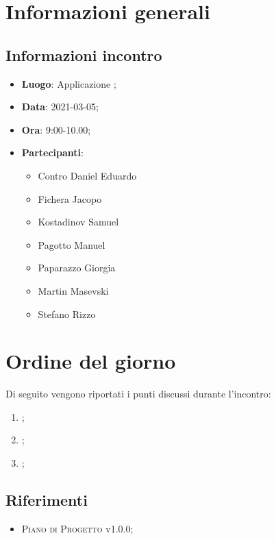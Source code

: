 \documentclass{article}
\begin{document}


\section{Informazioni generali}
\label{sec:info_generali}

\subsection{Informazioni incontro}
\label{sub:info_incontro}

\begin{itemize}
	\item \textbf{Luogo}: Applicazione ;
	\item \textbf{Data}: 2021-03-05;
	\item \textbf{Ora}: 9:00-10.00;
	\item \textbf{Partecipanti}:
	\begin{itemize}
		\item Contro Daniel Eduardo
		\item Fichera Jacopo
		\item Kostadinov Samuel
		\item Pagotto Manuel
		\item Paparazzo Giorgia
		\item Martin Masevski
		\item Stefano Rizzo
	\end{itemize}
\end{itemize}

\section{Ordine del giorno}%
\label{sec:ordine_del_giorno}

Di seguito vengono riportati i punti discussi durante l'incontro:
\begin{enumerate}
	\item {};
	\item {};
	\item {};
\end{enumerate}


\subsection{Riferimenti}%
\label{sub:riferimenti}
\begin{itemize}
    \item \textsc{Piano di Progetto} v1.0.0;
    \end{itemize}
\end{document}
